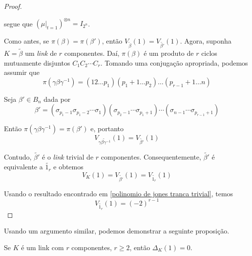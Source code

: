 \begin{proof}
\begin{equation*}
		\end{equation*}
		\par\vspace{0.3cm} segue que $(\mu|_{t=1})^{\otimes n} = I_{2^n}$.
		\par\vspace{0.3cm} Como antes, se $\pi(\beta) = \pi(\beta')$, então $V_{\widetilde{\beta}}(1) = V_{\widetilde{\beta'}}(1)$. Agora, suponha $K = \widetilde{\beta}$ um \textit{link} de $r$ componentes. Daí, $\pi(\beta)$ é um produto de $r$ ciclos mutuamente disjuntos  $C_1C_2\cdots C_r$. Tomando uma conjugação apropriada, podemos assumir que 
		\begin{equation*}
		\pi(\gamma\beta\gamma^{-1}) = (12\dots p_1)(p_1+1\dots p_2)\dots(p_{r-1}+1\dots n)
		\end{equation*}
		\par\vspace{0.3cm} Seja $\beta'\in B_n$ dada por
		\begin{equation*}
		\beta' = (\sigma_{p_1-1}\sigma_{p_1-2}\cdots\sigma_1)(\sigma_{p_2-1}\cdots\sigma_{p_1+1})\cdots( \sigma_{n-1}\cdots\sigma_{p_{r-1} + 1} )
		\end{equation*}
		\par\vspace{0.3cm} Então $\pi(\gamma\beta\gamma^{-1}) = \pi(\beta')$ e, portanto
		\begin{equation*}
		V_{\widetilde{\gamma\beta\gamma^{-1}}}(1) = V_{ \widetilde{\beta'} }(1)
		\end{equation*}
		\par\vspace{0.3cm} Contudo, $\widetilde{\beta'}$ é o \textit{link} trivial de $r$ componentes. Consequentemente, $\widetilde{\beta'}$ é equivalente a $\widetilde{1_r}$ e obtemos
		\begin{equation*}
		V_K(1) = V_{\widetilde{\beta'}}(1) = V_{\widetilde{1_r}}(1)
		\end{equation*}
		\par\vspace{0.3cm} Usando o resultado encontrado em \eqref{polinomio de jones tranca trivial}, temos
		\begin{equation*}
		V_{\widetilde{1_r}}(1) = (-2)^{r-1}
		\end{equation*}
	\end{proof}
	\par\vspace{0.3cm} Usando um argumento similar, podemos demonstrar a seguinte proposição.
	\begin{prop}
		\label{polinomio de Alexander para links}
		Se $K$ é um link com $r$ componentes, $r\geq 2$, então $\Delta_K(1) = 0$.
	\end{prop}

